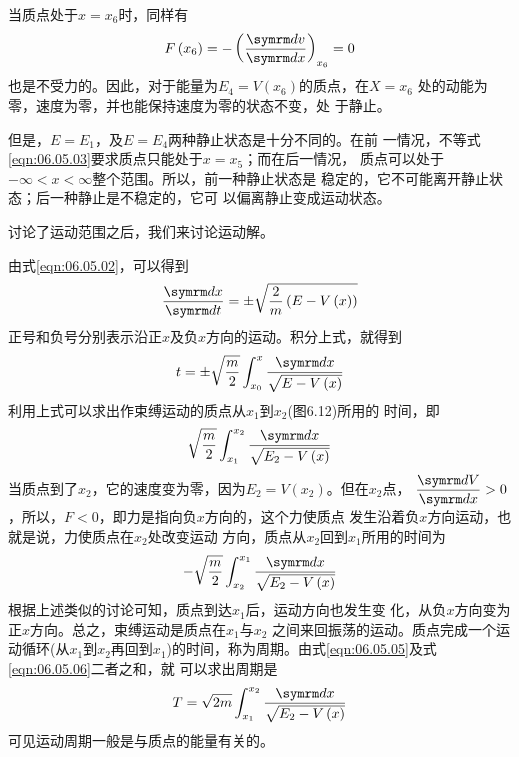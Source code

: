 当质点处于$ x = x_6 $时，同样有
\begin{equation*}
    F \left( x _ { 6 } \right) = - \left( \frac { \dif v } { \dif x } \right) _ { x _ 6 } = 0
\end{equation*}
也是不受力的。因此，对于能量为$  E _ { 4 } = V \left( x _ { 6 } \right)   $的质点，在$  X = x _ { 6 }  $
处的动能为零，速度为零，并也能保持速度为零的状态不变，处
于静止。

但是，$  E = E _ { 1 }   $，及$  E = E _ 4 $两种静止状态是十分不同的。在前
一情况，不等式\eqref{eqn:06.05.03}要求质点只能处于$  x = x _ { 5 } $；而在后一情况，
质点可以处于$ - \infty < x < \infty   $整个范围。所以，前一种静止状态是
稳定的，它不可能离开静止状态；后一种静止是不稳定的，它可
以偏离静止变成运动状态。

讨论了运动范围之后，我们来讨论运动解。

由式\eqref{eqn:06.05.02}，可以得到
\begin{equation*}
    \frac { \dif x } { \dif t } = \pm \sqrt { \frac { 2 } { m } \left( E - V \left( x \right) \right) }
\end{equation*}
正号和负号分别表示沿正$ x $及负$ x $方向的运动。积分上式，就得到
\begin{equation}\label{eqn:06.05.04}
    t = \pm \sqrt { \frac { m } { 2 } } \int _ { x _ { 0 } } ^ { x } \frac { \dif x } { \sqrt { E - V \left( x \right) } }
\end{equation}
利用上式可以求出作束缚运动的质点从$ x_1 $到$ x_2 $(图6.12)所用的
时间，即
\begin{equation}\label{eqn:06.05.05}
    \sqrt { \frac { m } { 2 } } \int _ { x _ { 1 } } ^ { x _ { 2 } } \frac { \dif x } { \sqrt { E _ { 2 } - V \left( x \right) } }
\end{equation}
当质点到了$ x_2 $，它的速度变为零，因为$  E _ { 2 } = V \left( x _ { 2 } \right)   $。但在$ x_2 $点，
$ \dfrac { \dif V } { \dif x } > 0   $
，所以，$  F < 0  $，即力是指向负$ x $方向的，这个力使质点
发生沿着负$ x $方向运动，也就是说，力使质点在$ x_2 $处改变运动
方向，质点从$ x_2 $回到$ x_1 $所用的时间为
\begin{equation}\label{eqn:06.05.06}
    - \sqrt { \frac { m } { 2 } } \int _ { x _ { 2 } } ^ { x _ { 1 } }  \frac { \dif x } { \sqrt { E _ { 2 } - V \left( x \right) } }
\end{equation}
根据上述类似的讨论可知，质点到达$ x_1 $后，运动方向也发生变
化，从负$ x $方向变为正$ x $方向。总之，束缚运动是质点在$ x_1 $与$ x_2 $
之间来回振荡的运动。质点完成一个运动循环(从$ x_1 $到$ x_2 $再回到$
x _ { 1 } $)的时间，称为周期。由式\eqref{eqn:06.05.05}及式\eqref{eqn:06.05.06}二者之和，就
可以求出周期是
\begin{equation}\label{eqn:06.05.07}
    T = \sqrt { 2 m } \int _ { x _ { 1 } } ^ { x _ { 2 } } \frac { \dif x } { \sqrt { { E _ { 2 } - V \left( x \right) } } }
\end{equation}
可见运动周期一般是与质点的能量有关的。

